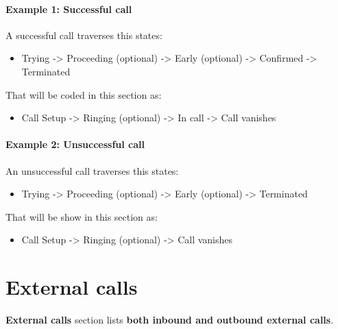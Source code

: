 \documentclass[letterpaper,10pt,spanish]{sphinxmanual}
\begin{document}
\paragraph{Example 1: Successful call}

A successful call traverses this states:
\begin{itemize}
\item {} 
Trying -\textgreater{} Proceeding (optional) -\textgreater{} Early (optional) -\textgreater{} Confirmed -\textgreater{} Terminated

\end{itemize}

That will be coded in this section as:
\begin{itemize}
\item {} 
Call Setup -\textgreater{} Ringing (optional) -\textgreater{} In call -\textgreater{} Call vanishes

\end{itemize}
\paragraph{Example 2: Unsuccessful call}

An unsuccessful call traverses this states:
\begin{itemize}
\item {} 
Trying -\textgreater{} Proceeding (optional) -\textgreater{} Early (optional) -\textgreater{} Terminated

\end{itemize}

That will be show in this section as:
\begin{itemize}
\item {} 
Call Setup -\textgreater{} Ringing (optional) -\textgreater{} Call vanishes

\end{itemize}
\label{administration_portal/platform/external_calls:external-calls}

\section{External calls}
\label{administration_portal/platform/external_calls:id2}\label{administration_portal/platform/external_calls:external-calls}\label{administration_portal/platform/external_calls::doc}\label{administration_portal/platform/external_calls:id1}
\textbf{External calls} section lists \textbf{both inbound and outbound external calls}.
\end{document}
